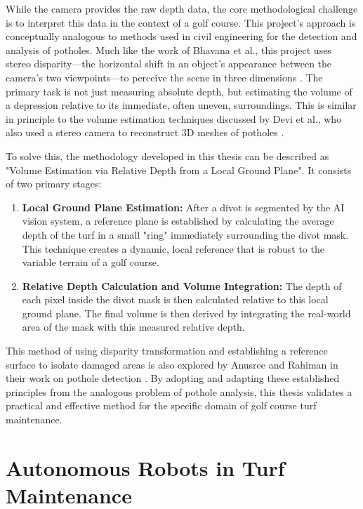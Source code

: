 While the camera provides the raw depth data, the core methodological challenge is to interpret this data in the context of a golf course. This project's approach is conceptually analogous to methods used in civil engineering for the detection and analysis of potholes. Much like the work of Bhavana et al., this project uses stereo disparity—the horizontal shift in an object's appearance between the camera's two viewpoints—to perceive the scene in three dimensions \cite{bhavana2023comprehensive}. The primary task is not just measuring absolute depth, but estimating the volume of a depression relative to its immediate, often uneven, surroundings. This is similar in principle to the volume estimation techniques discussed by Devi et al., who also used a stereo camera to reconstruct 3D meshes of potholes \cite{devi2019computer}.

To solve this, the methodology developed in this thesis can be described as "Volume Estimation via Relative Depth from a Local Ground Plane". It consists of two primary stages:
\begin{enumerate}
    \item \textbf{Local Ground Plane Estimation:} After a divot is segmented by the AI vision system, a reference plane is established by calculating the average depth of the turf in a small "ring" immediately surrounding the divot mask. This technique creates a dynamic, local reference that is robust to the variable terrain of a golf course.
    \item \textbf{Relative Depth Calculation and Volume Integration:} The depth of each pixel inside the divot mask is then calculated relative to this local ground plane. The final volume is then derived by integrating the real-world area of the mask with this measured relative depth.
\end{enumerate}

This method of using disparity transformation and establishing a reference surface to isolate damaged areas is also explored by Anusree and Rahiman in their work on pothole detection \cite{anusree2021pothole}. By adopting and adapting these established principles from the analogous problem of pothole analysis, this thesis validates a practical and effective method for the specific domain of golf course turf maintenance.


\section{Autonomous Robots in Turf Maintenance}
\label{sec:lit_turf_robots}

